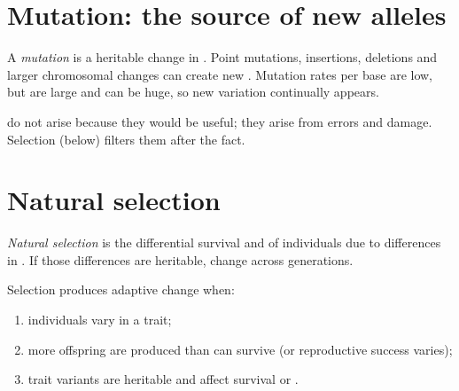 \section{Mutation: the source of new alleles}

\begin{definition}[Mutation]\label{def:g11:evolution-mechanisms:mutation}
A \emph{mutation} is a heritable change in  . Point
mutations, insertions, deletions and larger chromosomal changes can create new
. Mutation rates per base are low, but  are large and 
can be huge, so new variation continually appears.
\end{definition}

\begin{proposition}\label{prop:g11:evolution-mechanisms:random}
 do not arise because they would be useful; they arise from 
errors and damage. Selection (below) filters them after the fact.
\end{proposition}
\admitted

\section{Natural selection}

\begin{definition}\label{def:g11:evolution-mechanisms:selection}
\emph{Natural selection} is the differential survival
and  of individuals due to differences in . If those
differences are heritable,  change across generations.
\end{definition}

\begin{proposition}\label{prop:g11:evolution-mechanisms:req}
Selection produces adaptive change when:
\begin{enumerate}
  \item individuals vary in a trait;
  \item more offspring are produced than can survive (or reproductive success
        varies);
  \item trait variants are heritable and affect survival or .
\end{enumerate}
\end{proposition}
\admitted

